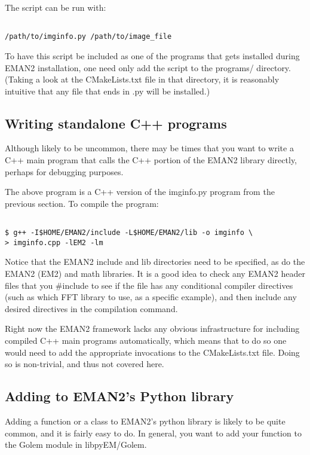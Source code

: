  The script can be run with:
\begin{verbatim}

/path/to/imginfo.py /path/to/image_file

\end{verbatim}


 To have this script be included as one of the programs that gets installed during EMAN2 installation, one need only add the script to the programs/ directory. (Taking a look at the CMakeLists.txt file in that directory, it is reasonably intuitive that any file that ends in .py will be installed.)
\subsection{Writing standalone C++ programs}


 Although likely to be uncommon, there may be times that you want to write a C++ main program that calls the C++ portion of the EMAN2 library directly, perhaps for debugging purposes.

 The above program is a C++ version of the imginfo.py program from the previous section. To compile the program:
\begin{verbatim}

$ g++ -I$HOME/EMAN2/include -L$HOME/EMAN2/lib -o imginfo \
> imginfo.cpp -lEM2 -lm

\end{verbatim}


 Notice that the EMAN2 include and lib directories need to be specified, as do the EMAN2 (EM2) and math libraries. It is a good idea to check any EMAN2 header files that you \#include to see if the file has any conditional compiler directives (such as which FFT library to use, as a specific example), and then include any desired directives in the compilation command.


 Right now the EMAN2 framework lacks any obvious infrastructure for including compiled C++ main programs automatically, which means that to do so one would need to add the appropriate invocations to the CMakeLists.txt file. Doing so is non-trivial, and thus not covered here.
\subsection{Adding to EMAN2's Python library}


 Adding a function or a class to EMAN2's python library is likely to be quite common, and it is fairly easy to do. In general, you want to add your function to the Golem module in libpyEM/Golem.


